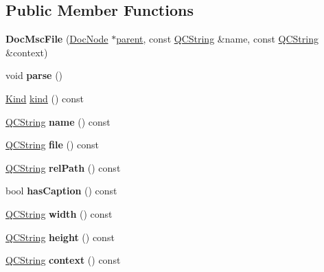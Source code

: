 \subsection*{Public Member Functions}
\begin{DoxyCompactItemize}
\item 
\mbox{\label{class_doc_msc_file_a0a89ab57d101a38da934fe2372ff40e8}} 
{\bfseries Doc\+Msc\+File} (\mbox{\hyperlink{class_doc_node}{Doc\+Node}} $\ast$\mbox{\hyperlink{class_doc_node_a73e8ad29a91cfceb0968eb00db71a23d}{parent}}, const \mbox{\hyperlink{class_q_c_string}{Q\+C\+String}} \&name, const \mbox{\hyperlink{class_q_c_string}{Q\+C\+String}} \&context)
\item 
\mbox{\label{class_doc_msc_file_af75b42178732dcddf90d1a8b4612d3d9}} 
void {\bfseries parse} ()
\item 
\mbox{\hyperlink{class_doc_node_aebd16e89ca590d84cbd40543ea5faadb}{Kind}} \mbox{\hyperlink{class_doc_msc_file_a99e65660ad498deb47ef3b5e9f456df1}{kind}} () const
\item 
\mbox{\label{class_doc_msc_file_a07f66a2958480b77600bf8b56127d64a}} 
\mbox{\hyperlink{class_q_c_string}{Q\+C\+String}} {\bfseries name} () const
\item 
\mbox{\label{class_doc_msc_file_a0fdb5e8cbc00891767d790e05b42dd4c}} 
\mbox{\hyperlink{class_q_c_string}{Q\+C\+String}} {\bfseries file} () const
\item 
\mbox{\label{class_doc_msc_file_aaa02e3922d11b9722343e1d425e72f3a}} 
\mbox{\hyperlink{class_q_c_string}{Q\+C\+String}} {\bfseries rel\+Path} () const
\item 
\mbox{\label{class_doc_msc_file_a4a61f81ff12589f04c73d956f89eab28}} 
bool {\bfseries has\+Caption} () const
\item 
\mbox{\label{class_doc_msc_file_aff0eb744e1863b1b23e2dc0a3bacdd1c}} 
\mbox{\hyperlink{class_q_c_string}{Q\+C\+String}} {\bfseries width} () const
\item 
\mbox{\label{class_doc_msc_file_a189cfa213441c6427605656a53a7372d}} 
\mbox{\hyperlink{class_q_c_string}{Q\+C\+String}} {\bfseries height} () const
\item 
\mbox{\label{class_doc_msc_file_acfb396a56f2caa94ba50d83d77c65630}} 
\mbox{\hyperlink{class_q_c_string}{Q\+C\+String}} {\bfseries context} () const
\end{DoxyCompactItemize}
